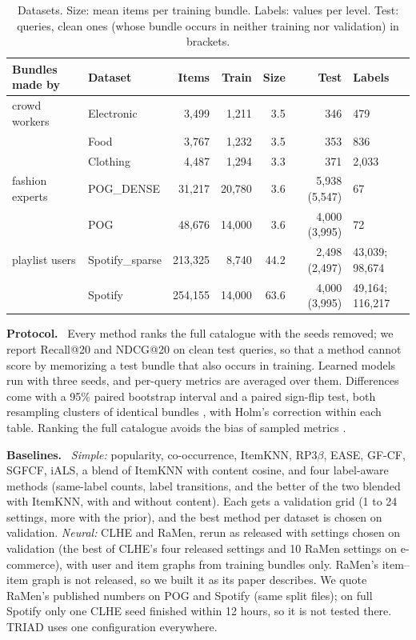 \documentclass[runningheads]{llncs}
\renewcommand{\paragraph}[1]{\smallskip\noindent\textbf{#1}\ }
\begin{document}
\begin{table}[t]
\centering
\caption{Datasets. Size: mean items per training bundle. Labels: values per level. Test: queries, clean ones (whose
bundle occurs in neither training nor validation) in brackets.}
\label{tab:data}
\setlength{\tabcolsep}{3pt}
\scriptsize
\begin{tabular}{llrrrrl}
\toprule
Bundles made by & Dataset & Items & Train & Size & Test & Labels\\
\midrule
crowd workers & Electronic & 3,499 & 1,211 & 3.5 & 346 & 479\\
 & Food & 3,767 & 1,232 & 3.5 & 353 & 836\\
 & Clothing & 4,487 & 1,294 & 3.3 & 371 & 2,033\\
fashion experts & POG\_DENSE & 31,217 & 20,780 & 3.6 & 5,938 (5,547) & 67\\
 & POG & 48,676 & 14,000 & 3.6 & 4,000 (3,995) & 72\\
playlist users & Spotify\_sparse & 213,325 & 8,740 & 44.2 & 2,498 (2,497) & 43,039; 98,674\\
 & Spotify & 254,155 & 14,000 & 63.6 & 4,000 (3,995) & 49,164; 116,217\\
\bottomrule
\end{tabular}
\end{table}

\paragraph{Protocol.} Every method ranks the full catalogue with the seeds removed; we report Recall@20 and NDCG@20 on
clean test queries, so that a method cannot score by memorizing a test bundle that also occurs in training. Learned models run with three seeds, and per-query metrics are averaged over them.
Differences come with a 95\% paired bootstrap interval and a paired sign-flip test, both resampling clusters of
identical bundles \cite{efron1993,smucker2007}, with Holm's correction \cite{holm1979} within each table. Ranking the
full catalogue avoids the bias of sampled metrics \cite{krichene2020}.

\paragraph{Baselines.} \emph{Simple:} popularity, co-occurrence, ItemKNN, RP3$\beta$, EASE, GF-CF, SGFCF, iALS, a
blend of ItemKNN with content cosine, and four label-aware methods (same-label counts, label transitions, and the
better of the two blended with ItemKNN, with and without content). Each gets a validation grid (1 to 24 settings, more with the prior), and
the best method per dataset is chosen on validation. \emph{Neural:} CLHE and RaMen, rerun as released with settings
chosen on validation (the best of CLHE's four released settings and 10 RaMen settings on e-commerce), with user and
item graphs from training bundles only. RaMen's item--item graph is not released, so we built it as its paper
describes. We quote RaMen's published numbers on POG and Spotify (same split files); on full Spotify only one CLHE seed
finished within 12 hours, so it is not tested there. TRIAD uses one configuration everywhere.
\end{document}
